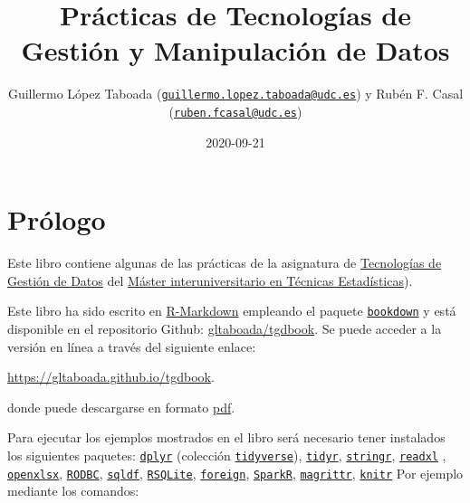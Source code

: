 \documentclass[]{book}
\title{Prácticas de Tecnologías de Gestión y Manipulación de Datos}
\author{Guillermo López Taboada
(\href{mailto:guillermo.lopez.taboada@udc.es}{\nolinkurl{guillermo.lopez.taboada@udc.es}})
y Rubén F. Casal
(\href{mailto:ruben.fcasal@udc.es}{\nolinkurl{ruben.fcasal@udc.es}})}
\date{2020-09-21}
\begin{document}
\maketitle

{
\setcounter{tocdepth}{1}
\tableofcontents
}
\chapter*{Prólogo}\label{pruxf3logo}

Este libro contiene algunas de las prácticas de la asignatura de
\href{http://eamo.usc.es/pub/mte/index.php/es/?option=com_content\&view=article\&id=2202\&idm=38\&a\%C3\%B1o=2020}{Tecnologías
de Gestión de Datos} del \href{http://eio.usc.es/pub/mte}{Máster
interuniversitario en Técnicas Estadísticas}).

Este libro ha sido escrito en
\href{http://rmarkdown.rstudio.com}{R-Markdown} empleando el paquete
\href{https://bookdown.org/yihui/bookdown/}{\texttt{bookdown}} y está
disponible en el repositorio Github:
\href{https://github.com/gltaboada/tgdbook}{gltaboada/tgdbook}. Se puede
acceder a la versión en línea a través del siguiente enlace:

\url{https://gltaboada.github.io/tgdbook}.

donde puede descargarse en formato
\href{https://gltaboada.github.io/tgdbook/Practicas_de_TGD.pdf}{pdf}.

Para ejecutar los ejemplos mostrados en el libro será necesario tener
instalados los siguientes paquetes:
\href{https://dplyr.tidyverse.org}{\texttt{dplyr}} (colección
\href{https://www.tidyverse.org/}{\texttt{tidyverse}}),
\href{https://tidyr.tidyverse.org}{\texttt{tidyr}},
\href{https://stringr.tidyverse.org}{\texttt{stringr}},
\href{https://readxl.tidyverse.org}{\texttt{readxl}} ,
\href{https://cran.r-project.org/web/packages/openxlsx/index.html}{\texttt{openxlsx}},
\href{https://cran.r-project.org/web/packages/RODBC/index.html}{\texttt{RODBC}},
\href{https://cran.r-project.org/web/packages/sqldf/index.html}{\texttt{sqldf}},
\href{https://r-dbi.github.io/RSQLite}{\texttt{RSQLite}},
\href{https://cran.r-project.org/web/packages/foreign/index.html}{\texttt{foreign}},
\href{https://cran.r-project.org/web/packages/SparkR/index.html}{\texttt{SparkR}},
\href{https://cran.r-project.org/web/packages/magrittr/index.html}{\texttt{magrittr}},
\href{https://yihui.name/knitr}{\texttt{knitr}} Por ejemplo mediante los
comandos:
\end{document}
